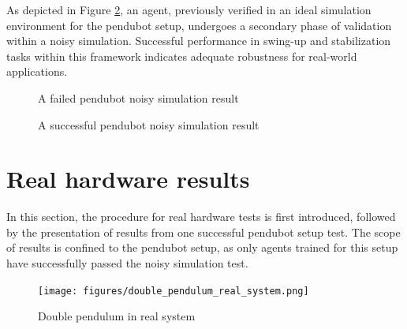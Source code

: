 As depicted in Figure \ref{fig:noisy_simulation_pendubot}, an agent, previously verified in an ideal simulation environment for the pendubot setup, undergoes a secondary phase of validation within a noisy simulation. Successful performance in swing-up and stabilization tasks within this framework indicates adequate robustness for real-world applications.

\begin{figure}[H]
    \centering
    \caption{A failed pendubot noisy simulation result}
    \label{fig:noisy_simulation_pendubot}
\end{figure}

\begin{figure}[H]
    \centering
    \caption{A successful pendubot noisy simulation result}
    \label{fig:noisy_simulation_pendubot}
\end{figure}





\section{Real hardware results}
In this section, the procedure for real hardware tests is first introduced, followed by the presentation of results from one successful pendubot setup test. The scope of results is confined to the pendubot setup, as only agents trained for this setup have successfully passed the noisy simulation test.


\begin{figure}[H]
    \centering
    \texttt{[image: figures/double\_pendulum\_real\_system.png]}
    \caption{Double pendulum in real system}
    \label{fig:image_b}
\end{figure}

